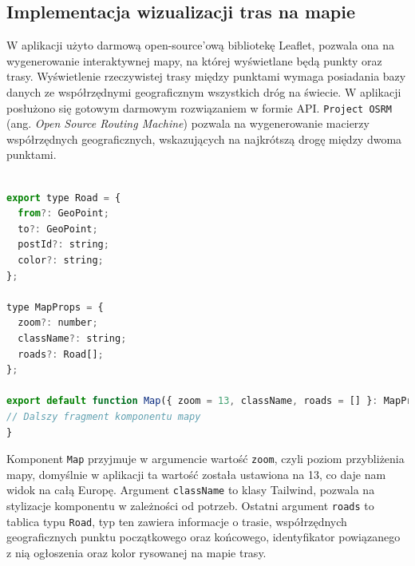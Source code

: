 \subsection{Implementacja wizualizacji tras na mapie}
W aplikacji użyto darmową open-source'ową bibliotekę Leaflet, pozwala ona na wygenerowanie interaktywnej mapy, na której wyświetlane będą punkty oraz trasy. Wyświetlenie rzeczywistej trasy między punktami wymaga posiadania bazy danych ze współrzędnymi geograficznym wszystkich dróg na świecie. W aplikacji posłużono się gotowym darmowym rozwiązaniem w formie API. \texttt{Project OSRM} (ang. \emph{Open Source Routing Machine}) pozwala na wygenerowanie macierzy współrzędnych geograficznych, wskazujących na najkrótszą drogę między dwoma punktami.

{\belowcaptionskip=-9pt
\begin{lstlisting}[language=JavaScript,caption=Argumenty komponentu mapy, label=lst:mapProps]

export type Road = {
  from?: GeoPoint;
  to?: GeoPoint;
  postId?: string;
  color?: string;
};

type MapProps = {
  zoom?: number;
  className?: string;
  roads?: Road[];
};

export default function Map({ zoom = 13, className, roads = [] }: MapProps) {
// Dalszy fragment komponentu mapy
}
\end{lstlisting}
}

Komponent \texttt{Map} przyjmuje w argumencie wartość \texttt{zoom}, czyli poziom przybliżenia mapy, domyślnie w aplikacji ta wartość została ustawiona na 13, co daje nam widok na całą Europę. Argument \texttt{className} to klasy Tailwind, pozwala na stylizacje komponentu w zależności od potrzeb. Ostatni argument \texttt{roads} to tablica typu \texttt{Road}, typ ten zawiera informacje o trasie, współrzędnych geograficznych punktu początkowego oraz końcowego, identyfikator powiązanego z nią ogłoszenia oraz kolor rysowanej na mapie trasy.

